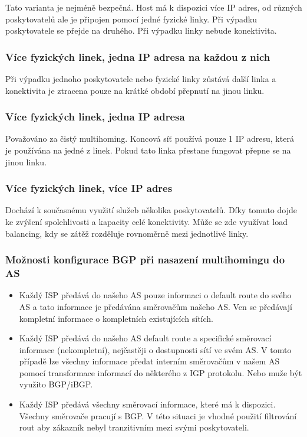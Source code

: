 Tato varianta je nejméně bezpečná.
Host má k dispozici více IP adres, od různých poskytovatelů ale je připojen pomocí jedné fyzické linky.
Při výpadku poskytovatele se přejde na druhého.
Při výpadku linky nebude konektivita.

\subsubsection{Více fyzických linek, jedna IP adresa na každou z nich}

Při výpadku jednoho poskytovatele nebo fyzické linky zůstává další linka a konektivita je ztracena pouze na krátké období přepnutí na jinou linku.

\subsubsection{Více fyzických linek, jedna IP adresa }

Považováno za čistý multihoming.
Koncová síť používá pouze 1 IP adresu, která je používána na jedné z linek.
Pokud tato linka přestane fungovat přepne se na jinou linku.

\subsubsection{Více fyzických linek, více IP adres}

Dochází k současnému využití služeb několika poskytovatelů.
Díky tomuto dojde ke zvýšení spolehlivosti a kapacity celé konektivity.
Může se zde využívat load balancing, kdy se zátěž rozděluje rovnoměrně mezi jednotlivé linky.

\subsubsection{Možnosti konfigurace BGP při nasazení multihomingu do AS}
\begin{itemize}[noitemsep]
        \item Každý ISP předává do našeho AS pouze informaci o default route do svého AS a tato informace je předávána směrovačům našeho AS.
        Ven se předávají kompletní informace o kompletních existujících sítích.
        \item Každý ISP předává do našeho AS default route a specifické směrovací informace (nekompletní), nejčastěji o dostupnosti sítí ve svém AS.
        V tomto případě lze všechny informace předat interním směrovačům v našem AS pomocí transformace informací do některého z IGP protokolu.
        Nebo muže být využito BGP/iBGP.
        \item Každý ISP předává všechny směrovací informace, které má k dispozici.
        Všechny směrovače pracují s BGP.
        V této situaci je vhodné použití filtrování rout aby zákazník nebyl tranzitivním mezi svými poskytovateli.
\end{itemize}

